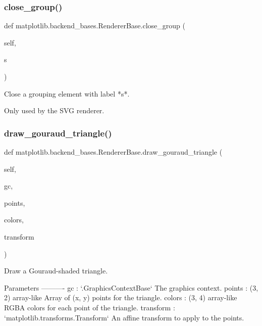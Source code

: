 \subsubsection{\texorpdfstring{close\+\_\+group()}{close\_group()}}
{\footnotesize\ttfamily def matplotlib.\+backend\+\_\+bases.\+Renderer\+Base.\+close\+\_\+group (\begin{DoxyParamCaption}\item[{}]{self,  }\item[{}]{s }\end{DoxyParamCaption})}

\begin{DoxyVerb}Close a grouping element with label *s*.

Only used by the SVG renderer.
\end{DoxyVerb}
 \mbox{\label{classmatplotlib_1_1backend__bases_1_1RendererBase_ad5ddf6488d4af7bfa3d1d7912174eff3}} 
\subsubsection{\texorpdfstring{draw\+\_\+gouraud\+\_\+triangle()}{draw\_gouraud\_triangle()}}
{\footnotesize\ttfamily def matplotlib.\+backend\+\_\+bases.\+Renderer\+Base.\+draw\+\_\+gouraud\+\_\+triangle (\begin{DoxyParamCaption}\item[{}]{self,  }\item[{}]{gc,  }\item[{}]{points,  }\item[{}]{colors,  }\item[{}]{transform }\end{DoxyParamCaption})}

\begin{DoxyVerb}Draw a Gouraud-shaded triangle.

Parameters
----------
gc : `.GraphicsContextBase`
    The graphics context.
points : (3, 2) array-like
    Array of (x, y) points for the triangle.
colors : (3, 4) array-like
    RGBA colors for each point of the triangle.
transform : `matplotlib.transforms.Transform`
    An affine transform to apply to the points.
\end{DoxyVerb}
 \mbox{\label{classmatplotlib_1_1backend__bases_1_1RendererBase_a6f6755c005aac6ab25ea5d7ad281ae27}} 
